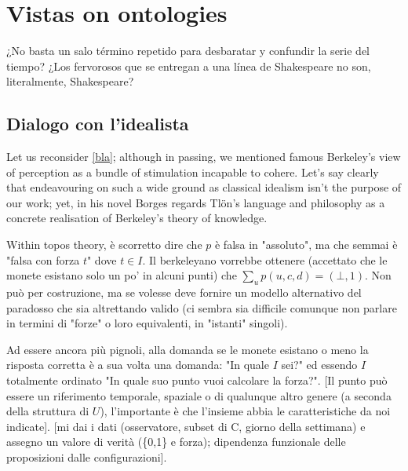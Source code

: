 \section{Vistas on ontologies}
\epigraph{¿No basta un salo término repetido para desbaratar y confundir la serie del tiempo? ¿Los fervorosos que se entregan a una línea de Shakespeare no son, literalmente, Shakespeare?}{\cite{confutacion}}
\subsection{Dialogo con l'idealista} 
Let us reconsider \autoref{bla}; although in passing, we mentioned famous Berkeley's view of perception as a bundle of stimulation incapable to cohere. Let's say clearly that endeavouring on such a wide ground as classical idealism isn't the purpose of our work; yet, in his novel Borges regards Tl\"on's language and philosophy as a concrete realisation of Berkeley's theory of knowledge. %

Within topos theory, è scorretto dire che $p$ è falsa in "assoluto", ma che semmai è "falsa con forza $t$" dove $t \in I$. Il berkeleyano vorrebbe ottenere (accettato che le monete esistano solo un po' in alcuni punti) che $\sum_u p(u,c,d) = (\bot,1)$. Non può per costruzione, ma se volesse deve fornire un modello alternativo del paradosso che sia altrettando valido (ci sembra sia difficile comunque non parlare in termini di "forze" o loro equivalenti, in "istanti" singoli).  

Ad essere ancora più pignoli, alla domanda se le monete esistano o meno la risposta corretta è a sua volta una domanda: "In quale $I$ sei?" ed essendo $I$ totalmente ordinato "In quale suo punto vuoi calcolare la forza?". [Il punto può essere un riferimento temporale, spaziale o di qualunque altro genere (a seconda della struttura di $U$), l'importante è che l'insieme abbia le caratteristiche da noi indicate]. [mi dai i dati (osservatore, subset di C, giorno della settimana) e assegno un valore di verità (\{0,1\} e forza); dipendenza funzionale delle proposizioni dalle configurazioni]. 


